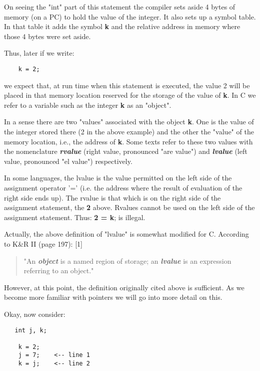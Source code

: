On seeing the "int" part of this statement the compiler sets aside 4
bytes of memory (on a PC) to hold the value of the integer. It also sets
up a symbol table. In that table it adds the symbol \textbf{k} and the
relative address in memory where those 4 bytes were set aside.

Thus, later if we write:

\begin{verbatim}
    k = 2; 
\end{verbatim}

we expect that, at run time when this statement is executed, the value 2
will be placed in that memory location reserved for the storage of the
value of \textbf{k}. In C we refer to a variable such as the integer
\textbf{k} as an "object".

In a sense there are two "values" associated with the object \textbf{k}.
One is the value of the integer stored there (2 in the above example)
and the other the "value" of the memory location, i.e., the address of
\textbf{k}. Some texts refer to these two values with the nomenclature
\emph{\textbf{rvalue}} (right value, pronounced "are value") and
\emph{\textbf{lvalue}} (left value, pronounced "el value") respectively.

In some languages, the lvalue is the value permitted on the left side of
the assignment operator '=' (i.e. the address where the result of
evaluation of the right side ends up). The rvalue is that which is on
the right side of the assignment statement, the \textbf{2} above.
Rvalues cannot be used on the left side of the assignment statement.
Thus: \textbf{2 = k}; is illegal.

Actually, the above definition of "lvalue" is somewhat modified for C.
According to K\&R II (page 197): {[}1{]}

\begin{quote}
"An \emph{\textbf{object}} is a named region of storage; an
\emph{\textbf{lvalue}} is an expression referring to an object."
\end{quote}

However, at this point, the definition originally cited above is
sufficient. As we become more familiar with pointers we will go into
more detail on this.

Okay, now consider:

\begin{verbatim}
   int j, k; 

    k = 2; 
    j = 7;    <-- line 1 
    k = j;    <-- line 2 
\end{verbatim}

